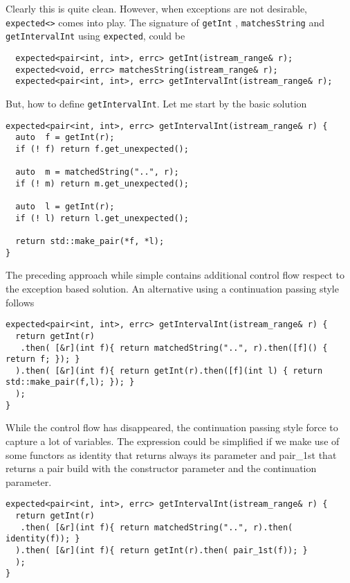 \documentclass[a4paper,10pt]{article}
\newcommand{\cpp}[1]{\lstinline{#1}}
\begin{document}
Clearly this is quite clean. However, when exceptions are not desirable, \cpp{expected<>} comes into play. 
The signature of \cpp{getInt} ,  \cpp{matchesString} and \cpp{getIntervalInt} using \cpp{expected}, could be 

\begin{lstlisting}
  expected<pair<int, int>, errc> getInt(istream_range& r);
  expected<void, errc> matchesString(istream_range& r);
  expected<pair<int, int>, errc> getIntervalInt(istream_range& r);
\end{lstlisting}

But, how to define \cpp{getIntervalInt}. Let me start by the basic solution

\begin{lstlisting}
expected<pair<int, int>, errc> getIntervalInt(istream_range& r) {
  auto  f = getInt(r);
  if (! f) return f.get_unexpected();

  auto  m = matchedString("..", r);
  if (! m) return m.get_unexpected();

  auto  l = getInt(r);
  if (! l) return l.get_unexpected();

  return std::make_pair(*f, *l);
}
\end{lstlisting}

The preceding approach while simple contains additional control flow respect to the exception based solution. An alternative using a continuation passing style follows

\begin{lstlisting}
expected<pair<int, int>, errc> getIntervalInt(istream_range& r) {
  return getInt(r)
   .then( [&r](int f){ return matchedString("..", r).then([f]() { return f; }); }
  ).then( [&r](int f){ return getInt(r).then([f](int l) { return std::make_pair(f,l); }); }
  );
}
\end{lstlisting}

While the control flow has disappeared, the continuation passing style force to capture a lot of variables. The expression could be simplified if we make use of some functors as identity that returns always its parameter and pair_1st that returns a pair build with the constructor parameter and the continuation parameter.

\begin{lstlisting}
expected<pair<int, int>, errc> getIntervalInt(istream_range& r) {
  return getInt(r)
   .then( [&r](int f){ return matchedString("..", r).then( identity(f)); }
  ).then( [&r](int f){ return getInt(r).then( pair_1st(f)); }
  );
}
\end{lstlisting}
\end{document}
